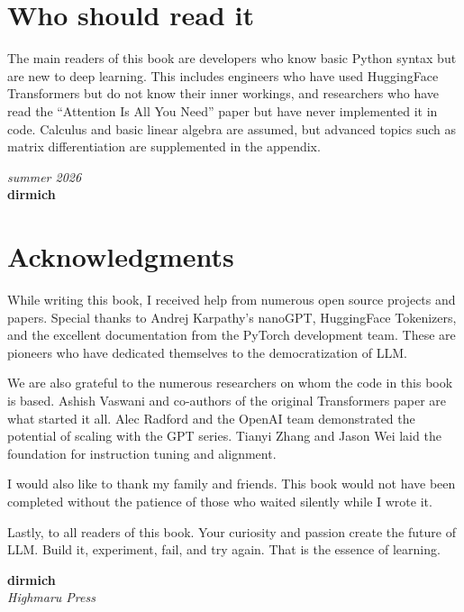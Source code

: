 \section*{Who should read it}

The main readers of this book are developers who know basic Python syntax but are new to deep learning. This includes engineers who have used HuggingFace Transformers but do not know their inner workings, and researchers who have read the ``Attention Is All You Need'' paper but have never implemented it in code. Calculus and basic linear algebra are assumed, but advanced topics such as matrix differentiation are supplemented in the appendix.

\begin{flushright}
\textit{summer 2026}\\[0.3em]
\textbf{dirmich}
\end{flushright}

\newpage

\section*{Acknowledgments}

While writing this book, I received help from numerous open source projects and papers. Special thanks to Andrej Karpathy's nanoGPT, HuggingFace Tokenizers, and the excellent documentation from the PyTorch development team. These are pioneers who have dedicated themselves to the democratization of LLM.

We are also grateful to the numerous researchers on whom the code in this book is based. Ashish Vaswani and co-authors of the original Transformers paper are what started it all. Alec Radford and the OpenAI team demonstrated the potential of scaling with the GPT series. Tianyi Zhang and Jason Wei laid the foundation for instruction tuning and alignment.

I would also like to thank my family and friends. This book would not have been completed without the patience of those who waited silently while I wrote it.

Lastly, to all readers of this book. Your curiosity and passion create the future of LLM. Build it, experiment, fail, and try again. That is the essence of learning.

\begin{flushright}
\textbf{dirmich}\\
\textit{Highmaru Press}
\end{flushright}
